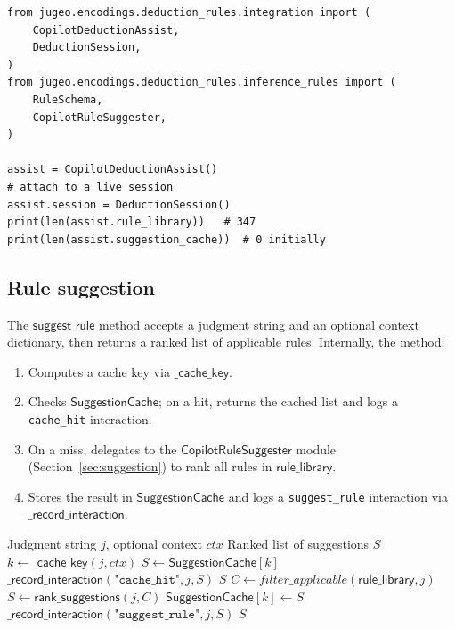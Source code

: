 \documentclass[11pt]{article}
\newcommand{\CDA}{\ensuremath{\mathsf{CopilotDeductionAssist}}}
\newcommand{\CRS}{\ensuremath{\mathsf{CopilotRuleSuggester}}}
\newcommand{\SC}{\ensuremath{\mathsf{SuggestionCache}}}
\newcommand{\suggestRule}{\ensuremath{\mathsf{suggest\_rule}}}
\newcommand{\rankSugg}{\ensuremath{\mathsf{rank\_suggestions}}}
\newcommand{\cacheKey}{\ensuremath{\mathsf{\_cache\_key}}}
\newcommand{\recordInter}{\ensuremath{\mathsf{\_record\_interaction}}}
\begin{document}
\begin{lstlisting}[style=jugeo-python,
  caption={$\CDA$ instantiation.},label=lst:cda]
from jugeo.encodings.deduction_rules.integration import (
    CopilotDeductionAssist,
    DeductionSession,
)
from jugeo.encodings.deduction_rules.inference_rules import (
    RuleSchema,
    CopilotRuleSuggester,
)

assist = CopilotDeductionAssist()
# attach to a live session
assist.session = DeductionSession()
print(len(assist.rule_library))   # 347
print(len(assist.suggestion_cache))  # 0 initially
\end{lstlisting}

\subsection{Rule suggestion}\label{ssec:suggest}

The $\suggestRule$ method accepts a judgment string and an optional
context dictionary, then returns a ranked list of applicable rules.
Internally, the method:
\begin{enumerate}
  \item Computes a cache key via $\cacheKey$.
  \item Checks $\SC$; on a hit, returns the cached list and logs a
    \texttt{cache\_hit} interaction.
  \item On a miss, delegates to the $\CRS$ module
    (Section~\ref{sec:suggestion}) to rank all rules in
    $\mathsf{rule\_library}$.
  \item Stores the result in $\SC$ and logs a
    \texttt{suggest\_rule} interaction via $\recordInter$.
\end{enumerate}

\begin{algorithm}[t]
\caption{$\suggestRule$: Copilot-assisted rule suggestion.}
\label{alg:suggest}
\begin{algorithmic}[1]
  \REQUIRE Judgment string $j$, optional context $\mathit{ctx}$
  \ENSURE Ranked list of suggestions $S$
  \STATE $k \gets \cacheKey(j, \mathit{ctx})$
  \IF{$k \in \SC$}
    \STATE $S \gets \SC[k]$
    \STATE $\recordInter(\texttt{"cache\_hit"}, j, S)$
    \RETURN $S$
  \ENDIF
  \STATE $C \gets \mathit{filter\_applicable}(\mathsf{rule\_library}, j)$
  \STATE $S \gets \rankSugg(j, C)$
  \STATE $\SC[k] \gets S$
  \STATE $\recordInter(\texttt{"suggest\_rule"}, j, S)$
  \RETURN $S$
\end{algorithmic}
\end{algorithm}
\end{document}
